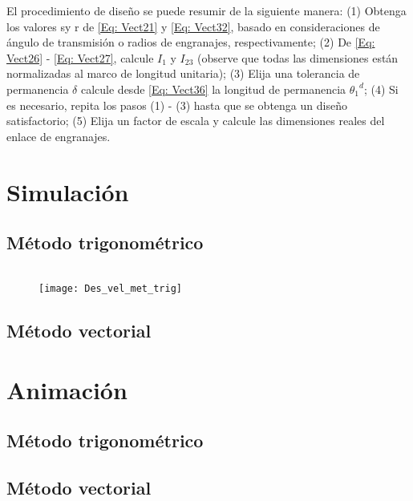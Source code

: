 \documentclass[12pt, final]{extarticle}
\begin{document}
El procedimiento de diseño se puede resumir de la siguiente manera: (1) Obtenga
los valores sy r de \eqref{Eq: Vect21} y \eqref{Eq: Vect32}, basado en
consideraciones de ángulo de transmisión o radios de engranajes,
respectivamente; (2) De \eqref{Eq: Vect26} - \eqref{Eq: Vect27}, calcule $I_1$ y
$I_{23}$ (observe que todas las dimensiones están normalizadas al marco de
longitud unitaria); (3) Elija una tolerancia de permanencia $\delta$ calcule
desde \eqref{Eq: Vect36} la longitud de permanencia ${\theta_1}^d$; (4) Si es
necesario, repita los pasos (1) - (3) hasta que se obtenga un diseño
satisfactorio; (5) Elija un factor de escala y calcule las dimensiones reales
del enlace de engranajes.

\newpage
\section{Simulación}
\subsection{Método trigonométrico}

{\small
\inputminted{matlab}{Codigos/ADA5_metodo_trig.m}}

\begin{figure}[ht]
    \centering
    \texttt{[image: Des\_vel\_met\_trig]}
\end{figure}

\newpage
\subsection{Método vectorial}



\newpage
\section{Animación}
\subsection{Método trigonométrico}

\subsection{Método vectorial}


\nocite{*}
\vfill


\end{document}
